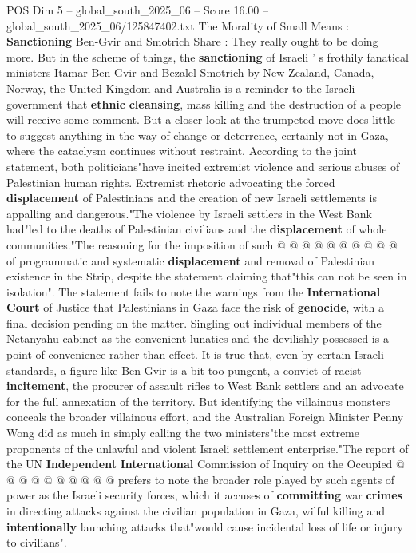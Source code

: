 \begin{textsample}{POS Dim 5 – global\_south\_2025\_06 – Score 16.00 – global\_south\_2025\_06/125847402.txt}  \label{ex:f5_pos_058}
The Morality of Small Means : \textbf{Sanctioning} Ben-Gvir and Smotrich Share : They really ought to be doing more.
But in the scheme of things, the \textbf{sanctioning} of Israeli ' s frothily fanatical ministers Itamar Ben-Gvir and Bezalel Smotrich by New Zealand, Canada, Norway, the United Kingdom and Australia is a reminder to the Israeli government that \textbf{ethnic} \textbf{cleansing}, mass killing and the destruction of a people will receive some comment.
But a closer look at the trumpeted move does little to suggest anything in the way of change or deterrence, certainly not in Gaza, where the cataclysm continues without restraint.
According to the joint statement, both politicians"have incited extremist violence and serious abuses of Palestinian human rights.
Extremist rhetoric advocating the forced \textbf{displacement} of Palestinians and the creation of new Israeli settlements is appalling and dangerous."The violence by Israeli settlers in the West Bank had"led to the deaths of Palestinian civilians and the \textbf{displacement} of whole communities."The reasoning for the imposition of such @ @ @ @ @ @ @ @ @ @ of programmatic and systematic \textbf{displacement} and removal of Palestinian existence in the Strip, despite the statement claiming that"this can not be seen in isolation".
The statement fails to note the warnings from the \textbf{International} \textbf{Court} of Justice that Palestinians in Gaza face the risk of \textbf{genocide}, with a final decision pending on the matter.
Singling out individual members of the Netanyahu cabinet as the convenient lunatics and the devilishly possessed is a point of convenience rather than effect.
It is true that, even by certain Israeli standards, a figure like Ben-Gvir is a bit too pungent, a convict of racist \textbf{incitement}, the procurer of assault rifles to West Bank settlers and an advocate for the full annexation of the territory.
But identifying the villainous monsters conceals the broader villainous effort, and the Australian Foreign Minister Penny Wong did as much in simply calling the two ministers"the most extreme proponents of the unlawful and violent Israeli settlement enterprise."The report of the UN \textbf{Independent} \textbf{International} Commission of Inquiry on the Occupied @ @ @ @ @ @ @ @ @ @ prefers to note the broader role played by such agents of power as the Israeli security forces, which it accuses of \textbf{committing} war \textbf{crimes} in directing attacks against the civilian population in Gaza, wilful killing and \textbf{intentionally} launching attacks that"would cause incidental loss of life or injury to civilians".

\end{textsample}
